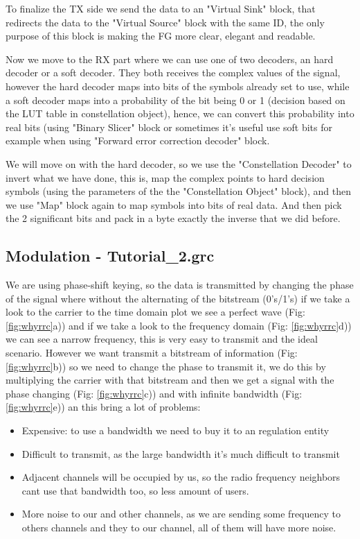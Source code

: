 \documentclass[a4paper, 10pt, conference]{ieeeconf}      %
\begin{document}
        To finalize the TX side we send the data to an "Virtual Sink" block, that redirects the data to the "Virtual Source" block with the same ID, the only purpose of this block is making the FG more clear, elegant and readable.
        
        Now we move to the RX part where we can use one of two decoders, an hard decoder or a soft decoder. They both receives the complex values of the signal, however the hard decoder maps into bits of the symbols already set to use, while a soft decoder maps into a probability of the bit being 0 or 1  (decision based on the LUT table in constellation object), hence, we can convert this probability into real bits (using "Binary Slicer" block or sometimes it's useful use soft bits for example when using "Forward error correction decoder" block. 
        
        We will move on with the hard decoder, so we use the "Constellation Decoder" to invert what we have done, this is, map the complex points to hard decision symbols (using the parameters of the the "Constellation Object" block), and then we use "Map" block again to map symbols into bits of real data. And then pick the 2 significant bits and pack in a byte exactly the inverse that we did before.
        
        
\subsection{Modulation - Tutorial\_2.grc}
    We are using phase-shift keying, so the data is transmitted by changing the phase of the signal where without the alternating of the bitstream (0's/1's) if we take a look to the carrier to the time domain plot we see a perfect wave (Fig: \ref{fig:whyrrc}a)) and if we take a look to the frequency domain  (Fig: \ref{fig:whyrrc}d)) we can see a narrow frequency, this is very easy to transmit and the ideal scenario. However we want transmit a bitstream of information  (Fig: \ref{fig:whyrrc}b)) so we need to change the phase to transmit it, we do this by multiplying the carrier with that bitstream and then we get a signal with the phase changing  (Fig: \ref{fig:whyrrc}c)) and with infinite bandwidth   (Fig: \ref{fig:whyrrc}e)) an this bring a lot of problems:
    \begin{itemize}
        \item Expensive: to use a bandwidth we need to buy it to an regulation entity
        \item Difficult to transmit, as the large bandwidth it's much difficult to transmit
        \item Adjacent channels will be occupied by us, so the radio frequency neighbors cant use that bandwidth too, so less amount of users.
        \item More noise to our and other channels, as we are sending some frequency to others channels and they to our channel, all of them will have more noise. 
    \end{itemize}{}
    
\end{document}
